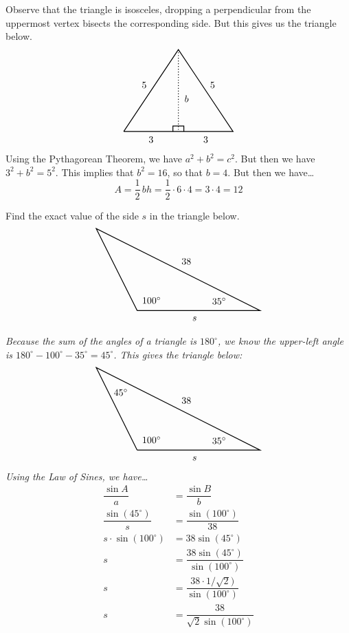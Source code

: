 \documentclass[12pt,letterpaper]{exam}
\begin{document}
\begin{questions}
{Observe that the triangle is isosceles, dropping a perpendicular from the uppermost vertex bisects the corresponding side. But this gives us the triangle below. 
	\[
	\begin{tikzpicture}
	\draw[line width=0.03cm] (-2,0) -- (0,3) -- (2,0) -- (-2,0);
	\draw[line width=0.03cm] (-0.2,0) -- (-0.2,0.2) -- (0.2,0.2) -- (0.2,0);
	\draw[line width=0.03cm,dotted] (0,3) -- (0,0);
	\node at (-1.25,1.7) {$5$};
	\node at (1.25,1.7) {$5$};
	\node at (-1,-0.3) {$3$};
	\node at (1,-0.3) {$3$};
	\node at (0.3,1.2) {$b$};
	\end{tikzpicture}
	\] 
Using the Pythagorean Theorem, we have $a^2 + b^2= c^2$. But then we have $3^2 + b^2= 5^2$. This implies that $b^2= 16$, so that $b= 4$. But then we have\dots
	\[
	A= \dfrac{1}{2}\, bh= \dfrac{1}{2} \cdot 6 \cdot 4= 3 \cdot 4= 12
	\]
}



\newpage
\question[10] Find the exact value of the side $s$ in the triangle below. 
	\[
	\begin{tikzpicture}[scale=1.5]
	\draw[line width=0.03cm] (-1,0) -- (-2,2) -- (2,0) -- (-1,0);
	\node at (-0.65,0.25) {$100^\circ$};
	\node at (1.0,0.23) {$35^\circ$};
	\node at (0.2,1.2) {$38$};
	\node at (0.4,-0.2) {$s$};
	\end{tikzpicture}
	\] \pspace

{\itshape \sol Because the sum of the angles of a triangle is $180^\circ$, we know the upper-left angle is $180^\circ - 100^\circ - 35^\circ= 45^\circ$. This gives the triangle below:
	\[
	\begin{tikzpicture}[scale=1.5]
	\draw[line width=0.03cm] (-1,0) -- (-2,2) -- (2,0) -- (-1,0);
	\node at (-0.65,0.25) {$100^\circ$};
	\node at (1.0,0.23) {$35^\circ$};
	\node at (0.2,1.2) {$38$};
	\node at (0.4,-0.2) {$s$};
	\node at (-1.4,1.4) {$45^\circ$};
	\end{tikzpicture}
	\] 
Using the Law of Sines, we have\dots
	\[
	\begin{aligned}
	\dfrac{\sin A}{a}&= \dfrac{\sin B}{b} \\[0.3cm]
	\dfrac{\sin(45^\circ)}{s}&= \dfrac{\sin(100^\circ)}{38} \\[0.3cm]
	s \cdot \sin(100^\circ)&= 38 \sin(45^\circ) \\[0.3cm] 
	s&= \dfrac{38 \sin(45^\circ)}{\sin(100^\circ)} \\[0.3cm]
	s&= \dfrac{38 \cdot 1/\sqrt{2})}{\sin(100^\circ)} \\[0.3cm]
	s&= \dfrac{38}{\sqrt{2} \sin(100^\circ)}
	\end{aligned}
	\]
}




\end{questions}
\end{document}
